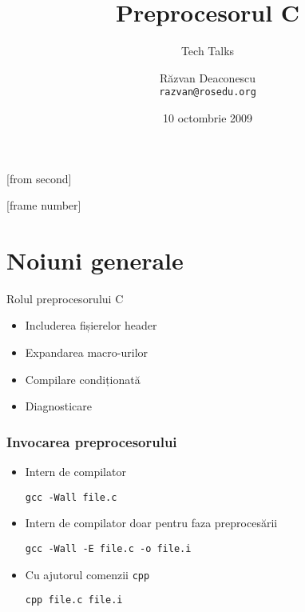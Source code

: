\documentclass{beamer}
\title[Preprocesorul C]{Preprocesorul C}
\subtitle{Tech Talks}
\institute{ROSEdu}
\author[Răzvan]{Răzvan Deaconescu \\ \texttt{razvan@rosedu.org}}
\date{10 octombrie 2009}
\begin{document}
[from second]

[frame number]

\frame{\titlepage}

\frame{\tableofcontents}

\section{Noiuni generale}

\frame{\tableofcontents[currentsection]}

\begin{frame}{Rolul preprocesorului C}
	\begin{itemize}		%
		\item Includerea fișierelor header
		\item Expandarea macro-urilor
		\item Compilare condiționată
		\item Diagnosticare
	\end{itemize}
\end{frame}

\begin{frame}[allowframebreaks] %
	\frametitle{Invocarea preprocesorului}
	\begin{itemize}
		\item Intern de compilator
			\begin{beamerboxesrounded}[lower=block body,shadow=true]{}
				\large{\texttt{gcc -Wall file.c}}
			\end{beamerboxesrounded}
		\item Intern de compilator doar pentru faza preprocesării
			\begin{beamerboxesrounded}[lower=block body,shadow=true]{}
				\large{\texttt{gcc -Wall -E file.c -o file.i}}
			\end{beamerboxesrounded}
		\item Cu ajutorul comenzii \texttt{cpp}
			\begin{beamerboxesrounded}[lower=block body,shadow=true]{}
				\large{\texttt{cpp file.c file.i}}
			\end{beamerboxesrounded}
	\end{itemize}
\end{frame}
\end{document}
